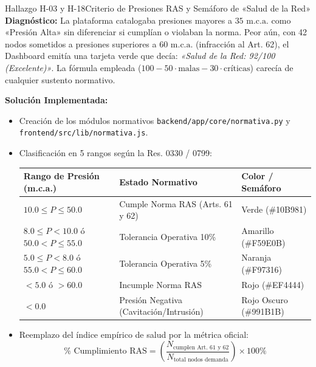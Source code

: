 \documentclass[11pt,letterpaper]{article}
\begin{document}
\begin{hallazgobox}{Hallazgo H-03 y H-18}{Criterio de Presiones RAS y Semáforo de «Salud de la Red»}
\textbf{Diagnóstico:}
La plataforma catalogaba presiones mayores a $35\text{ m.c.a.}$ como «Presión Alta» sin diferenciar si cumplían o violaban la norma. Peor aún, con 42 nodos sometidos a presiones superiores a $60\text{ m.c.a.}$ (infracción al Art. 62), el Dashboard emitía una tarjeta verde que decía: \textit{«Salud de la Red: 92/100 (Excelente)»}. La fórmula empleada ($100 - 50\cdot \text{malas} - 30\cdot \text{críticas}$) carecía de cualquier sustento normativo.

\textbf{Solución Implementada:}
\begin{itemize}
    \item Creación de los módulos normativos \texttt{backend/app/core/normativa.py} y \texttt{frontend/src/lib/normativa.js}.
    \item Clasificación en 5 rangos según la Res. 0330 / 0799:
    \begin{center}
    \small
    \begin{tabular}{lll}
        \toprule
        \textbf{Rango de Presión (m.c.a.)} & \textbf{Estado Normativo} & \textbf{Color / Semáforo} \\
        \midrule
        $10.0 \le P \le 50.0$ & Cumple Norma RAS (Arts. 61 y 62) & Verde (\#10B981) \\
        $8.0 \le P < 10.0$ ó $50.0 < P \le 55.0$ & Tolerancia Operativa 10\% & Amarillo (\#F59E0B) \\
        $5.0 \le P < 8.0$ ó $55.0 < P \le 60.0$ & Tolerancia Operativa 5\% & Naranja (\#F97316) \\
        $< 5.0$ ó $> 60.0$ & Incumple Norma RAS & Rojo (\#EF4444) \\
        $< 0.0$ & Presión Negativa (Cavitación/Intrusión) & Rojo Oscuro (\#991B1B) \\
        \bottomrule
    \end{tabular}
    \end{center}
    \item Reemplazo del índice empírico de salud por la métrica oficial:
    \begin{equation}
        \% \text{ Cumplimiento RAS} = \left(\frac{N_{\text{cumplen Art. 61 y 62}}}{N_{\text{total nodos demanda}}}\right) \times 100\%
    \end{equation}
\end{itemize}
\end{hallazgobox}
\end{document}
